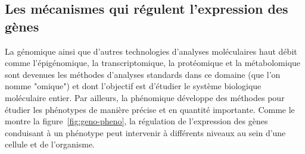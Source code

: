 \subsection{Les mécanismes qui régulent l'expression des gènes}
La génomique ainsi que d'autres technologies d'analyses moléculaires haut débit comme l'épigénomique, la transcriptomique, la protéomique et la métabolomique sont devenues les méthodes d'analyses standards dans ce domaine (que l'on nomme "omique") et dont l'objectif est d'étudier le système biologique moléculaire entier. Par ailleurs, la phénomique développe des méthodes pour étudier les phénotypes de manière précise et en quantité importante. Comme le montre la figure~\ref{fig:geno-pheno}, la régulation de l'expression des gènes conduisant à un phénotype peut intervenir à différents niveaux au sein d'une cellule et de l'organisme. \\
